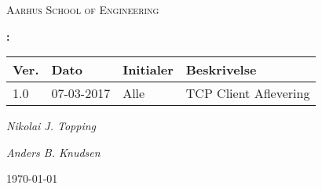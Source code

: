 \begin{titlepage}
	\centering
	{\scshape\LARGE Aarhus School of Engineering \par}
	\vspace{1cm}
	{\huge\bfseries \Kursus : \OpgaveTitel \par}
	\vspace{.5cm}
	{\large\bfseries \GruppeNummer \par}
	\vspace{5cm}
	\begin{center}
		\large\begin{tabular}{| l | l | l | l |}
			\hline
			\textbf{Ver.} & \textbf{Dato} & \textbf{Initialer} & \textbf{Beskrivelse} \\ \hline
			1.0 & 07-03-2017 & Alle & TCP Client Aflevering \\
			\hline
		\end{tabular}
	\end{center}
	\vspace{5cm}
	{\Large\itshape Nikolai J. Topping\par}
	{\Large\itshape Anders B. Knudsen\par}
	{\large \today\par}
\end{titlepage}